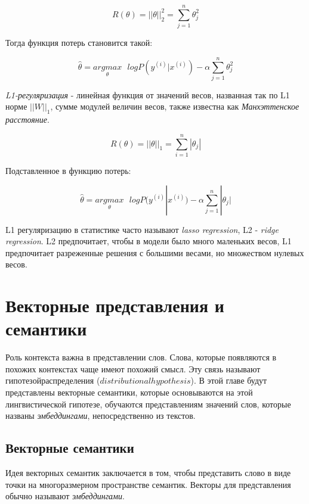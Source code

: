 \documentclass[a4paper,12pt,preview]{report} %
\begin{document}
	\begin{equation}
	R(\theta) = ||\theta||_2^2 = \sum_{j=1}^{n} \theta_j^2
	\end{equation}
	
	Тогда функция потерь становится такой:
	
	\begin{equation}
	\hat{\theta} = \underset{\theta}{argmax} \text{ } logP(y^{(i)} | x^{(i)}) - \alpha \sum_{j=1}^{n} \theta_j^2
	\end{equation}
	
	\textit{L1-регуляризация} - линейная функция от значений весов, названная так по L1 норме $||W||_1$, сумме модулей величин весов, также известна как \textit{Манхэттенское расстояние}.
	
	\begin{equation}
	R(\theta) = ||\theta||_1 = \sum_{i=1}^n |\theta_j|
	\end{equation}   
	
	Подставленное в функцию потерь:
	
	\begin{equation}
	\hat{\theta} = \underset{\theta}{argmax} \text{ } logP(y^{(i)} | x^{(i)}) - \alpha \sum_{j=1}^{n} |\theta_j|
	\end{equation}
	
	L1 регуляризацию в статистике часто называют \textit{lasso regression}, L2 - \textit{ridge regression}. L2 предпочитает, чтобы в модели было много  маленьких весов, L1 предпочитает разреженные решения с большими весами, но множеством нулевых весов.
	
	
	\section{Векторные представления и семантики}
	
	Роль контекста важна в представлении слов. Слова, которые появляются в похожих контекстах чаще имеют похожий смысл. Эту связь называют $гипотезой распределения$ ($distributional hypothesis$). В этой главе будут представлены векторные семантики, которые основываются на этой лингвистической гипотезе, обучаются представлениям значений слов, которые названы \textit{эмбеддингами}, непосредственно из текстов. 
	
	
	\subsection{Векторные семантики}
	
	Идея векторных семантик заключается в том, чтобы представить слово в виде точки на многоразмерном пространстве семантик. Векторы для представления обычно называют \textit{эмбеддингами}. 
	
\end{document}

